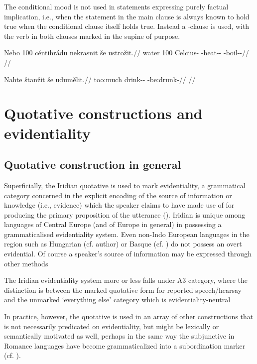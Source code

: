 The conditional mood is not used in statements expressing purely factual implication, i.e., when the statement in the main clause is always known to hold true when the conditional clause itself holds true. Instead a -clause is used, with the verb in both clauses marked in the supine of purpose.

\pex
\begingl
\gla Nebo 100 céntihrádu nekrasnit še ustrožit.//
\glb water 100 Celcius-\Ins{} \Caus{}-heat-\Pv{}-\SupP{} \Com{} \Refl{}-boil-\Av{}-\SupP{}//
\glft {}//
\endgl
\xe

\pex
\begingl
\gla Nahte štanžit še udumělit.//
\glb too:much drink-\Av-\SupP{} \Com{} \Refl{}-be:drunk-\SupP{}//
\glft {}//
\endgl
\xe

\section{Quotative constructions and  evidentiality}\label{sec:reportedspeech}


\subsection{Quotative construction in general}

Superficially, the Iridian quotative is used to mark {\sc evidentiality}, a grammatical category concerned in the explicit encoding of the source of information or knowledge (i.e., evidence) which the speaker claims to have made use of for producing the primary proposition of the utterance (\cite[1-2]{diewald2010}). Iridian is unique among languages of Central Europe (and of Europe in general) in possessing a grammaticalised evidentiality system. Even non-Indo European languages in the region such as Hungarian (cf. author) or Basque (cf. \cite{alcazar2010}) do not possess an overt evidential. Of course a speaker’s source of information may be expressed through other methods

The Iridian evidentiality system more or less falls under  A3 category, where the distinction is between the marked quotative form for reported speech/hearsay and the unmarked ‘everything else’ category which is evidentiality-neutral


In practice, however, the quotative is used in an array of other constructions that is not necessarily predicated on evidentiality, but might be lexically or semantically motivated as well, perhaps in the same way the subjunctive in Romance languages have become grammaticalized into a subordination marker (cf. \cite{poplacketal}).

